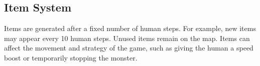 \subsection{Item System}

Items are generated after a fixed number of human steps. For example, new items may appear every 10 human steps. Unused items remain on the map. Items can affect the movement and strategy of the game, such as giving the human a speed boost or temporarily stopping the monster.
